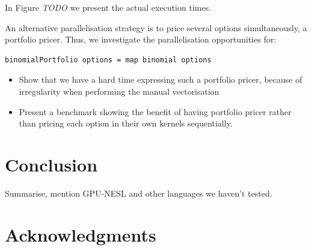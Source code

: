 \documentclass{llncs2e/llncs}
\begin{document}
In Figure \emph{TODO} we present the actual execution times.

An alternative parallelisation strategy is to price several
options simultaneously, a portfolio pricer. Thus, we investigate
the parallelisation opportunities for:
\begin{verbatim}
binomialPortfolio options = map binomial options
\end{verbatim}


\begin{itemize}
\item Show that we have a hard time expressing such a portfolio
  pricer, because of irregularity when performing the manual
  vectorisation
\item Present a benchmark showing the benefit of having portfolio
  pricer rather than pricing each option in their own kernels
  sequentially.
\end{itemize}



\section{Conclusion}
Summarise, mention GPU-NESL and other languages we haven't tested.

\section{Acknowledgments}


 

\end{document}
